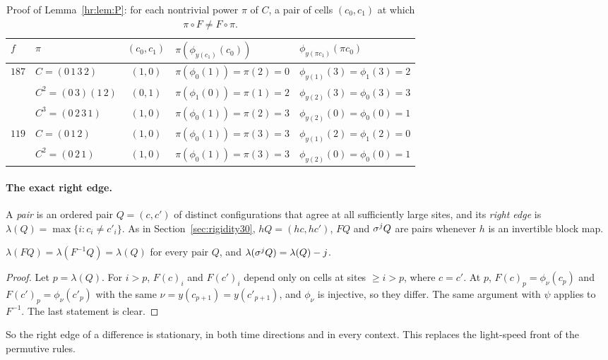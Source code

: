 \begin{table}[ht]
\centering
\begin{tabular}{llcll}
\toprule
$f$ & $\pi$ & $(c_0,c_1)$ & $\pi(\phi_{y(c_1)}(c_0))$ & $\phi_{y(\pi c_1)}(\pi c_0)$\\
\midrule
$187$ & $C=(0\,1\,3\,2)$ & $(1,0)$ & $\pi(\phi_0(1))=\pi(2)=0$ & $\phi_{y(1)}(3)=\phi_1(3)=2$\\
& $C^2=(0\,3)(1\,2)$ & $(0,1)$ & $\pi(\phi_1(0))=\pi(1)=2$ & $\phi_{y(2)}(3)=\phi_0(3)=3$\\
& $C^3=(0\,2\,3\,1)$ & $(1,0)$ & $\pi(\phi_0(1))=\pi(2)=3$ & $\phi_{y(2)}(0)=\phi_0(0)=1$\\
\midrule
$119$ & $C=(0\,1\,2)$ & $(1,0)$ & $\pi(\phi_0(1))=\pi(3)=3$ & $\phi_{y(1)}(2)=\phi_1(2)=0$\\
& $C^2=(0\,2\,1)$ & $(1,0)$ & $\pi(\phi_0(1))=\pi(3)=3$ & $\phi_{y(2)}(0)=\phi_0(0)=1$\\
\bottomrule
\end{tabular}
\caption{Proof of Lemma~\ref{hr:lem:P}: for each nontrivial power $\pi$ of $C$, a pair of cells $(c_0,c_1)$ at which $\pi\circ F\ne F\circ\pi$.}
\label{hr:tab:P}
\end{table}

\paragraph{The exact right edge.} A \emph{pair} is an ordered pair $Q=(c,c')$ of distinct configurations that agree at all sufficiently large sites, and its \emph{right edge} is $\lambda(Q)=\max\{i:c_i\ne c'_i\}$. As in Section~\ref{sec:rigidity30}, $hQ=(hc,hc')$, $FQ$ and $\sigma^jQ$ are pairs whenever $h$ is an invertible block map.

\begin{lemma}\label{hr:lem:edge}
$\lambda(FQ)=\lambda(F^{-1}Q)=\lambda(Q)$ for every pair $Q$, and $\lambda(\sigma^jQ)=\lambda(Q)-j$.
\end{lemma}

\begin{proof}
Let $p=\lambda(Q)$. For $i>p$, $F(c)_i$ and $F(c')_i$ depend only on cells at sites $\ge i>p$, where $c=c'$. At $p$, $F(c)_p=\phi_\nu(c_p)$ and $F(c')_p=\phi_\nu(c'_p)$ with the same $\nu=y(c_{p+1})=y(c'_{p+1})$, and $\phi_\nu$ is injective, so they differ. The same argument with $\psi$ applies to $F^{-1}$. The last statement is clear.
\end{proof}

So the right edge of a difference is stationary, in both time directions and in every context. This replaces the light-speed front of the permutive rules.

